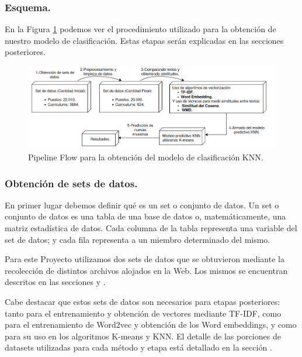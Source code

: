 \documentclass[12pt,a4paper]{article}
\begin{document}
\begin{sloppypar}
\subsubsection{Esquema.}

En la Figura \ref{fig:FlowCoreSystem} podemos ver el procedimiento utilizado para la obtención de nuestro modelo de clasificación. Estas etapas serán explicadas en las secciones posteriores. \\

\begin{figure}[H]    %
  \centering
  \includegraphics[width=1\textwidth]{images/flow-core.png} 	%
  \caption{Pipeline Flow para la obtención del modelo de clasificación KNN. \\}  
  \label{fig:FlowCoreSystem}
\end{figure}

\subsubsection{Obtención de sets de datos.}\label{obtencion_set_datos}

En primer lugar debemos definir qué es un set o conjunto de datos.
Un set o conjunto de datos es una tabla de una base de datos o, matemáticamente, una matriz estadística de datos. Cada columna de la tabla representa una variable del set de datos; y cada fila representa a un miembro determinado del mismo.

Para este Proyecto utilizamos dos sets de datos que se obtuvieron mediante la recolección de distintos archivos alojados en la Web. Los mismos se encuentran descritos en las secciones \textit{} y \textit{}.

Cabe destacar que estos sets de datos son necesarios para etapas posteriores: tanto para el entrenamiento y obtención de vectores mediante TF-IDF, como para el entrenamiento de Word2vec y obtención de los Word embeddings, y como para su uso en los algoritmos K-means y KNN. El detalle de las porciones de datasets utilizadas para cada método y etapa está detallado en la sección \textit{}.


\end{sloppypar}
\end{document}
